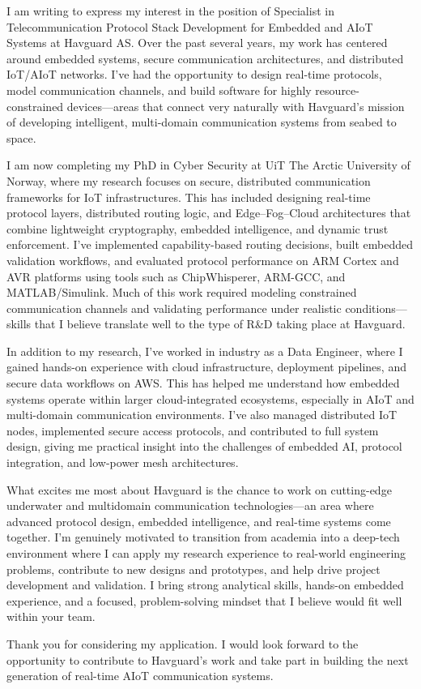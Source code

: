 I am writing to express my interest in the position of Specialist in Telecommunication Protocol Stack Development for Embedded and AIoT Systems at Havguard AS. Over the past several years, my work has centered around embedded systems, secure communication architectures, and distributed IoT/AIoT networks. I’ve had the opportunity to design real-time protocols, model communication channels, and build software for highly resource-constrained devices—areas that connect very naturally with Havguard’s mission of developing intelligent, multi-domain communication systems from seabed to space.

I am now completing my PhD in Cyber Security at UiT The Arctic University of Norway, where my research focuses on secure, distributed communication frameworks for IoT infrastructures. This has included designing real-time protocol layers, distributed routing logic, and Edge–Fog–Cloud architectures that combine lightweight cryptography, embedded intelligence, and dynamic trust enforcement. I’ve implemented capability-based routing decisions, built embedded validation workflows, and evaluated protocol performance on ARM Cortex and AVR platforms using tools such as ChipWhisperer, ARM-GCC, and MATLAB/Simulink. Much of this work required modeling constrained communication channels and validating performance under realistic conditions—skills that I believe translate well to the type of R&D taking place at Havguard.

In addition to my research, I’ve worked in industry as a Data Engineer, where I gained hands-on experience with cloud infrastructure, deployment pipelines, and secure data workflows on AWS. This has helped me understand how embedded systems operate within larger cloud-integrated ecosystems, especially in AIoT and multi-domain communication environments. I’ve also managed distributed IoT nodes, implemented secure access protocols, and contributed to full system design, giving me practical insight into the challenges of embedded AI, protocol integration, and low-power mesh architectures.

What excites me most about Havguard is the chance to work on cutting-edge underwater and multidomain communication technologies—an area where advanced protocol design, embedded intelligence, and real-time systems come together. I’m genuinely motivated to transition from academia into a deep-tech environment where I can apply my research experience to real-world engineering problems, contribute to new designs and prototypes, and help drive project development and validation. I bring strong analytical skills, hands-on embedded experience, and a focused, problem-solving mindset that I believe would fit well within your team.

Thank you for considering my application. I would look forward to the opportunity to contribute to Havguard’s work and take part in building the next generation of real-time AIoT communication systems.